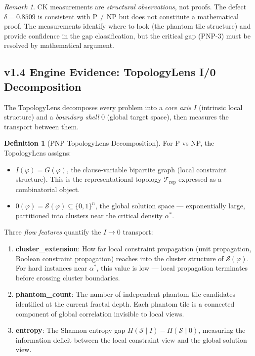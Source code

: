\documentclass[11pt]{article}
\theoremstyle{definition}
\newtheorem{definition}[theorem]{Definition}
\theoremstyle{remark}
\newtheorem{remark}[theorem]{Remark}
\newcommand{\calS}{\mathcal{S}}
\begin{document}
\begin{remark}
CK measurements are \emph{structural observations}, not proofs.  The defect
$\delta = 0.8509$ is consistent with $\mathrm{P} \neq \mathrm{NP}$ but
does not constitute a mathematical proof.  The measurements identify where
to look (the phantom tile structure) and provide confidence in the gap
classification, but the critical gap (PNP-3) must be resolved by mathematical
argument.
\end{remark}

\subsection{v1.4 Engine Evidence: TopologyLens I/0 Decomposition}
\label{sec:topology-lens-pnp}

The TopologyLens decomposes every problem into a \emph{core axis} $I$ (intrinsic
local structure) and a \emph{boundary shell} $0$ (global target space), then
measures the transport between them.

\begin{definition}[PNP TopologyLens Decomposition]
\label{def:pnp-topology-lens}
For P vs NP, the TopologyLens assigns:
\begin{itemize}[nosep]
  \item $I(\varphi) = G(\varphi)$, the clause-variable bipartite graph (local
    constraint structure).  This is the representational topology
    $\mathcal{T}_{\mathrm{rep}}$ expressed as a combinatorial object.
  \item $0(\varphi) = \calS(\varphi) \subseteq \{0,1\}^n$, the global solution
    space --- exponentially large, partitioned into clusters near the critical
    density $\alpha^*$.
\end{itemize}
Three \emph{flow features} quantify the $I \to 0$ transport:
\begin{enumerate}[nosep]
  \item \textbf{cluster\_extension}: How far local constraint propagation
    (unit propagation, Boolean constraint propagation) reaches into the cluster
    structure of $\calS(\varphi)$.  For hard instances near $\alpha^*$, this
    value is low --- local propagation terminates before crossing cluster
    boundaries.
  \item \textbf{phantom\_count}: The number of independent phantom tile
    candidates identified at the current fractal depth.  Each phantom tile
    is a connected component of global correlation invisible to local views.
  \item \textbf{entropy}: The Shannon entropy gap $H(\calS \mid I) - H(\calS \mid 0)$,
    measuring the information deficit between the local constraint view and the
    global solution view.
\end{enumerate}
\end{definition}
\end{document}
